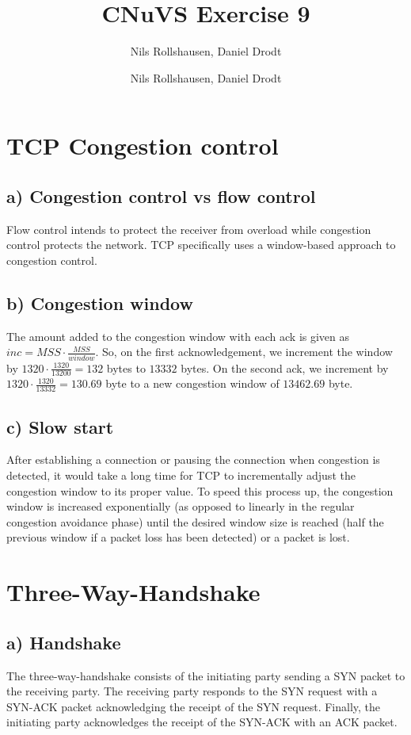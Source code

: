 \documentclass[a4paper, 11 pt, article, accentcolor=tud7b]{tudreport}
\title{CNuVS Exercise 9}
\author{Nils Rollshausen, Daniel Drodt}
\subtitle{Nils Rollshausen, Daniel Drodt}
\begin{document}
	\maketitle
	\section{TCP Congestion control}
	\subsection*{a) Congestion control vs flow control}
	Flow control intends to protect the receiver from overload while congestion control protects the network. TCP specifically uses a window-based approach to congestion control.
	  
	\subsection*{b) Congestion window}
	The amount added to the congestion window with each ack is given as $inc = MSS \cdot \frac{MSS}{window}$. So, on the first acknowledgement, we increment the window by $1320 \cdot \frac{1320}{13200} = 132$ bytes to $13332$ bytes. On the second ack, we increment by $1320 \cdot \frac{1320}{13332} = 130.69$ byte to a new congestion window of $13462.69$ byte.
	
	\subsection*{c) Slow start}
	After establishing a connection or pausing the connection when congestion is detected, it would take a long time for TCP to incrementally adjust the congestion window to its proper value. To speed this process up, the congestion window is increased exponentially (as opposed to linearly in the regular congestion avoidance phase) until the desired window size is reached (half the previous window if a packet loss has been detected) or a packet is lost.
	
	\section{Three-Way-Handshake}
	
	\subsection*{a) Handshake}
	The three-way-handshake consists of the initiating party sending a SYN packet to the receiving party. The receiving party responds to the SYN request with a SYN-ACK packet acknowledging the receipt of the SYN request. Finally, the initiating party acknowledges the receipt of the SYN-ACK with an ACK packet.
	
\end{document}
